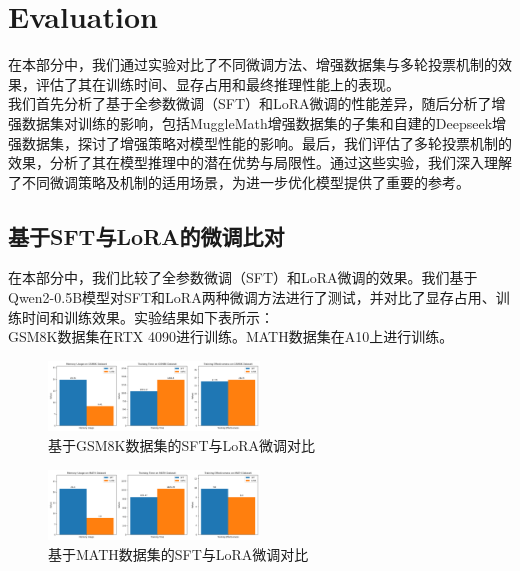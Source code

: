 \documentclass{article}
\begin{document}
\section{Evaluation}

在本部分中，我们通过实验对比了不同微调方法、增强数据集与多轮投票机制的效果，评估了其在训练时间、显存占用和最终推理性能上的表现。\\
我们首先分析了基于全参数微调（SFT）和LoRA微调的性能差异，随后分析了增强数据集对训练的影响，包括MuggleMath增强数据集的子集和自建的Deepseek增强数据集，探讨了增强策略对模型性能的影响。最后，我们评估了多轮投票机制的效果，分析了其在模型推理中的潜在优势与局限性。通过这些实验，我们深入理解了不同微调策略及机制的适用场景，为进一步优化模型提供了重要的参考。

\subsection{基于SFT与LoRA的微调比对}
在本部分中，我们比较了全参数微调（SFT）和LoRA微调的效果。我们基于Qwen2-0.5B模型对SFT和LoRA两种微调方法进行了测试，并对比了显存占用、训练时间和训练效果。实验结果如下表所示：
\\ GSM8K数据集在RTX 4090进行训练。MATH数据集在A10上进行训练。

\begin{figure}[H]
  \centering
  \includegraphics[width=0.5\textwidth]{GSM8K-LORA.png} %
  \caption{基于GSM8K数据集的SFT与LoRA微调对比} %
  \label{fig:my_label0} %
\end{figure}
\begin{figure}[H]
  \centering
  \includegraphics[width=0.5\textwidth]{MATH-LORA.png} %
  \caption{基于MATH数据集的SFT与LoRA微调对比} %
  \label{fig:my_label3} %
\end{figure}
\end{document}
